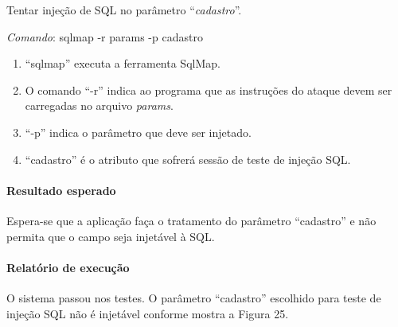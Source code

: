 \documentclass[
    12pt,               %
    openright,          %
    oneside,            %
    a4paper,            %
    section=TITLE,     %
    english,            %
    french,             %
    spanish,            %
    brazil              %
    ]{abntex2}
\begin{document}
Tentar injeção de SQL no parâmetro \textquotedblleft{}\emph{cadastro}\textquotedblright{}.


\emph{Comando}: sqlmap -r params -p cadastro



\begin{enumerate}[start=1]
	
\item \textquotedblleft{}sqlmap\textquotedblright{} executa a ferramenta SqlMap.
	
\item O comando \textquotedblleft{}-r\textquotedblright{} indica ao programa que as instruções do ataque devem ser carregadas no arquivo \emph{params}.
	
\item \textquotedblleft{}-p\textquotedblright{} indica o parâmetro que deve ser injetado.
	
\item \textquotedblleft{}cadastro\textquotedblright{} é o atributo que sofrerá sessão de teste de injeção SQL.

\end{enumerate}


\paragraph*{Resultado esperado}

Espera-se que a aplicação faça o tratamento do parâmetro \textquotedblleft{}cadastro\textquotedblright{} e não permita que o campo seja injetável à SQL.



\paragraph*{Relatório de execução}

O sistema passou nos testes. O parâmetro \textquotedblleft{}cadastro\textquotedblright{} escolhido para teste de injeção SQL não é injetável conforme mostra a Figura 25.
\end{document}
